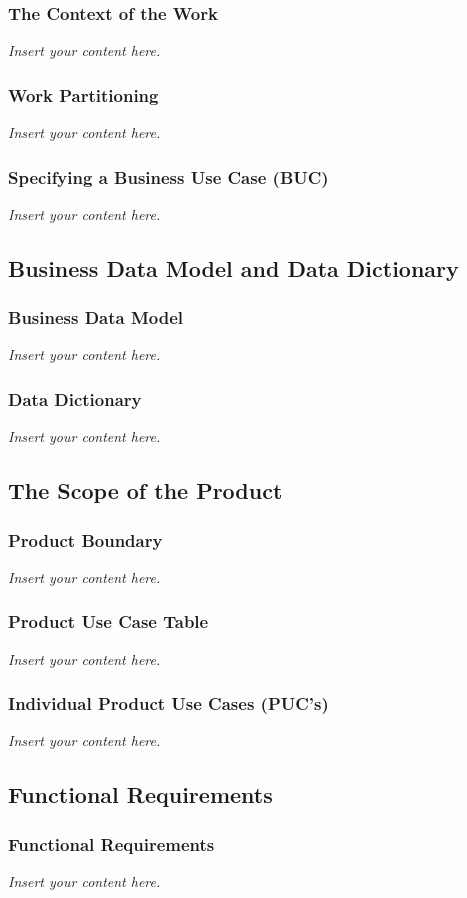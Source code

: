 \documentclass[12pt]{article}
\newcommand{\lips}{\textit{Insert your content here.}}
\begin{document}
\subsubsection{The Context of the Work}
\lips
\subsubsection{Work Partitioning}
\lips
\subsubsection{Specifying a Business Use Case (BUC)}
\lips

\subsection{Business Data Model and Data Dictionary}
\subsubsection{Business Data Model}
\lips
\subsubsection{Data Dictionary}
\lips

\subsection{The Scope of the Product}
\subsubsection{Product Boundary}
\lips
\subsubsection{Product Use Case Table}
\lips
\subsubsection{Individual Product Use Cases (PUC's)}
\lips

\subsection{Functional Requirements}
\subsubsection{Functional Requirements}
\lips
\end{document}

